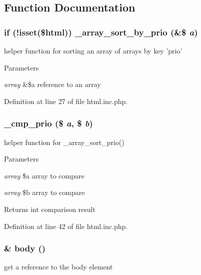 \subsection{Function Documentation}
\hypertarget{html_8inc_8php_a7fb2b386b2bae219112628971275c225}{
\subsubsection[{\_\-array\_\-sort\_\-by\_\-prio}]{\setlength{\rightskip}{0pt plus 5cm}if (!isset(\$html)) \_\-array\_\-sort\_\-by\_\-prio (\&\$ {\em a})}}
\label{html_8inc_8php_a7fb2b386b2bae219112628971275c225}
helper function for sorting an array of arrays by key 'prio'


\begin{DoxyParams}{Parameters}
\item[{\em array}]\&\$a reference to an array \end{DoxyParams}


Definition at line 27 of file html.inc.php.

\hypertarget{html_8inc_8php_af8ecadff0a4b78867d4da5eae49615e1}{
\subsubsection[{\_\-cmp\_\-prio}]{\setlength{\rightskip}{0pt plus 5cm}\_\-cmp\_\-prio (\$ {\em a}, \/  \$ {\em b})}}
\label{html_8inc_8php_af8ecadff0a4b78867d4da5eae49615e1}
helper function for \_\-array\_\-sort\_\-prio()


\begin{DoxyParams}{Parameters}
\item[{\em array}]\$a array to compare \item[{\em array}]\$b array to compare \end{DoxyParams}
\begin{DoxyReturn}{Returns}
int comparison result 
\end{DoxyReturn}


Definition at line 42 of file html.inc.php.

\hypertarget{html_8inc_8php_a8b842636055e9a5853a7a10a9e002330}{
\subsubsection[{body}]{\setlength{\rightskip}{0pt plus 5cm}\& body ()}}
\label{html_8inc_8php_a8b842636055e9a5853a7a10a9e002330}
get a reference to the body element

